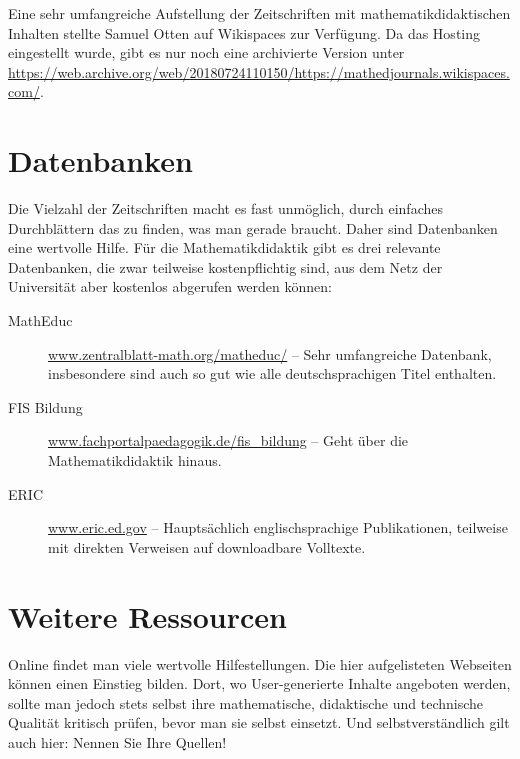 \documentclass[ngerman,oneside,12pt,a4paper]{scrbook}
\begin{document}
Eine sehr umfangreiche Aufstellung der Zeitschriften mit
mathematikdidaktischen Inhalten stellte Samuel Otten auf Wikispaces zur
Verfügung. Da das Hosting eingestellt wurde, gibt es nur noch eine
archivierte Version unter
\url{https://web.archive.org/web/20180724110150/https://mathedjournals.wikispaces.com/}.

\section{Datenbanken}\label{datenbanken}

Die Vielzahl der Zeitschriften macht es fast unmöglich, durch einfaches
Durchblättern das zu finden, was man gerade braucht. Daher sind
Datenbanken eine wertvolle Hilfe. Für die Mathematikdidaktik gibt es
drei relevante Datenbanken, die zwar teilweise kostenpflichtig sind, aus
dem Netz der Universität aber kostenlos abgerufen werden können:

\begin{description}
\item[MathEduc]
\href{https://www.zentralblatt-math.org/matheduc/}{www.zentralblatt-math.org/matheduc/}
-- Sehr umfangreiche Datenbank, insbesondere sind auch so gut wie alle
deutschsprachigen Titel enthalten.
\item[FIS Bildung]
\href{https://www.fachportalpaedagogik.de/fis_bildung}{www.fachportalpaedagogik.de/fis\_bildung}
-- Geht über die Mathematikdidaktik hinaus.
\item[ERIC]
\href{https://www.eric.ed.gov}{www.eric.ed.gov} -- Hauptsächlich
englischsprachige Publikationen, teilweise mit direkten Verweisen auf
downloadbare Volltexte.
\end{description}

\section{Weitere Ressourcen}\label{weitere-ressourcen}

Online findet man viele wertvolle Hilfestellungen. Die hier
aufgelisteten Webseiten können einen Einstieg bilden. Dort, wo
User-generierte Inhalte angeboten werden, sollte man jedoch stets selbst
ihre mathematische, didaktische und technische Qualität kritisch prüfen,
bevor man sie selbst einsetzt. Und selbstverständlich gilt auch hier:
Nennen Sie Ihre Quellen!
\end{document}

